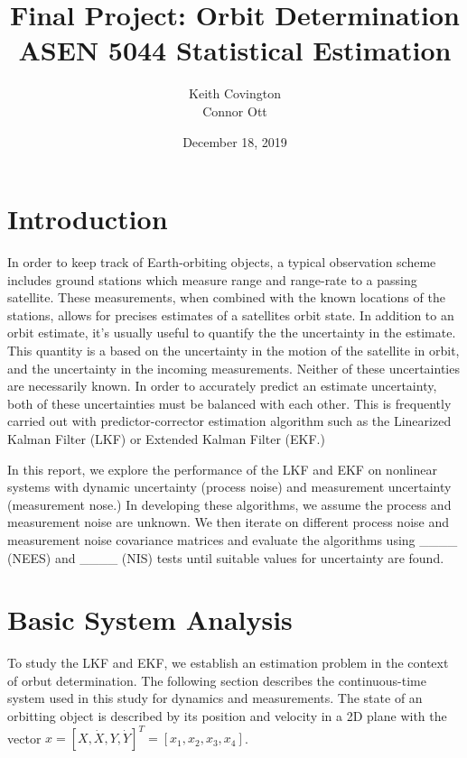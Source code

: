 \documentclass[11pt, a4paper]{article}
\begin{document}
\title{Final Project: Orbit Determination\\ ASEN 5044 Statistical Estimation}
\author{Keith Covington\\Connor Ott}
\date{December 18, 2019}
\maketitle



\section*{Introduction}
In order to keep track of Earth-orbiting objects, a typical observation scheme includes ground stations which measure range and range-rate to a passing satellite. 
These measurements, when combined with the known locations of the stations, allows for precises estimates of a satellites orbit state. 
In addition to an orbit estimate, it's usually useful to quantify the the uncertainty in the estimate. 
This quantity is a based on the uncertainty in the motion of the satellite in orbit, and the uncertainty in the incoming measurements. 
Neither of these uncertainties are necessarily known.
In order to accurately predict an estimate uncertainty, both of these uncertainties must be balanced with each other. 
This is frequently carried out with predictor-corrector estimation algorithm such as the Linearized Kalman Filter (LKF) or Extended Kalman Filter (EKF.)

In this report, we explore the performance of the LKF and EKF on nonlinear systems with dynamic uncertainty (process noise) and measurement uncertainty (measurement nose.) 
In developing these algorithms, we assume the process and measurement noise are unknown.
We then iterate on different process noise and measurement noise covariance matrices and evaluate the algorithms using \_\_\_\_ (NEES) and \_\_\_\_ (NIS) tests until suitable values for uncertainty are found. 

\section{Basic System Analysis}
\label{sec: Part I}

To study the LKF and EKF, we establish an estimation problem in the context of orbut determination. 
The following section describes the continuous-time system used in this study for dynamics and measurements.
The state of an orbitting object is described by its position and velocity in a 2D plane with the vector $x = [X, \dot{X}, Y, \dot{Y}]^T = [x_1, x_2, x_3, x_4]$.
\end{document}
